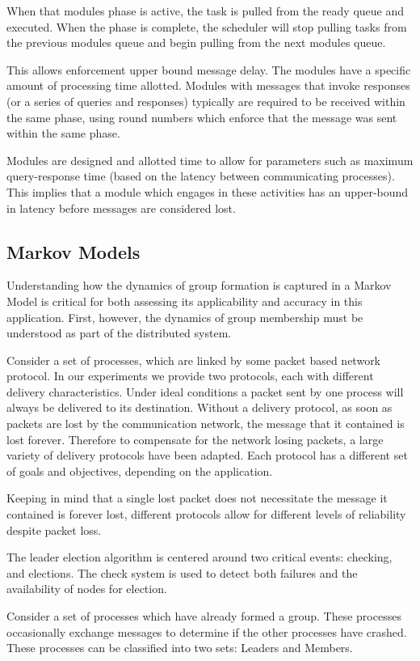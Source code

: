 When that modules phase is active, the task is pulled from the ready queue and
executed. When the phase is complete, the scheduler will stop pulling tasks
from the previous modules queue and begin pulling from the next modules queue.

This allows enforcement upper bound message delay. The modules have a specific
amount of processing time allotted. Modules with messages that invoke responses
(or a series of queries and responses) typically are required to be received
within the same phase, using round numbers which enforce that the message was
sent within the same phase.

Modules are designed and allotted time to allow for parameters such as maximum
query-response time (based on the latency between communicating processes). 
This implies that a module which engages in these activities has an
upper-bound in latency before messages are considered lost.

\subsection{Markov Models}
Understanding how the dynamics of group formation is captured in a Markov Model 
is critical for both assessing its applicability and accuracy in this 
application. First, however, the dynamics of group membership must be 
understood as part of the distributed system.

Consider a set of processes, which are linked by some packet based network 
protocol. In our experiments we provide two protocols, each with different 
delivery characteristics. Under ideal conditions a packet sent by one process 
will always be delivered to its destination. Without a delivery protocol, as 
soon as packets are lost by the communication network, the message that it 
contained is lost forever. Therefore to compensate for the network losing 
packets, a large variety of delivery protocols have been adapted. Each protocol 
has a different set of goals and objectives, depending on the application.

Keeping in mind that a single lost packet does not necessitate the message it 
contained is forever lost, different protocols allow for different levels of 
reliability despite packet loss.

The leader election algorithm is centered around two critical events: checking, 
and elections. The check system is used to detect both failures and the 
availability of nodes for election.

Consider a set of processes which have already formed a group. These processes 
occasionally exchange messages to determine if the other processes have 
crashed. These processes can be classified into two sets: Leaders and Members.

